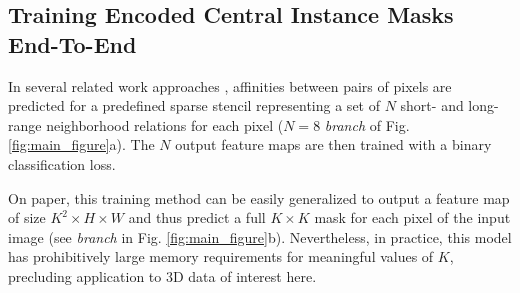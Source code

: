 \begin{figure}[t]
\begin{minipage}[t]{0.58\textwidth}
    \label{fig:mask_cases}
\end{minipage}
\end{figure}

\subsection{Training Encoded Central Instance Masks End-To-End}\label{sec:encoding_masks}
In several related work approaches \cite{liu2018affinity,Gao_2019_ICCV,lee2017superhuman,wolf2018mutex,bailoni2019generalized}, affinities between pairs of pixels are predicted for a predefined sparse stencil representing a set of $N$ short- and long-range neighborhood relations for each pixel  ($N=8$ \emph{\sparseBr branch} of Fig. \ref{fig:main_figure}a). The $N$ output feature maps  are then trained with a binary classification loss. 


On paper, this training method can be easily generalized to output a feature map of size $K^2 \times H \times W$ and thus predict a full $K\times K$ \maskname mask for each pixel of the input image (see \emph{\denseBr branch} in Fig. \ref{fig:main_figure}b).
Nevertheless, in practice, this model has prohibitively large memory requirements for meaningful values of $K$, precluding application to 3D data of interest here.

